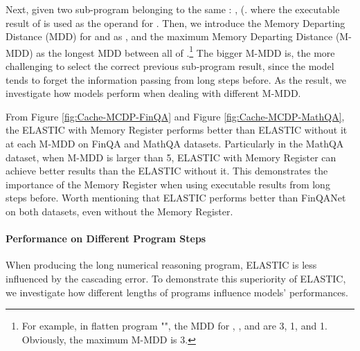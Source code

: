 \documentclass{article}
\begin{document}
Next, given two sub-program belonging to the same : ,  (. where the executable result of  is used as the operand for . Then, we introduce the Memory Departing Distance (MDD) for  and  as , and the maximum Memory Departing Distance (M-MDD) as the longest MDD between all  of .\footnote{For example, in flatten program "", the MDD for , , and  are 3, 1, and 1. Obviously, the maximum M-MDD is 3.} The bigger M-MDD is, the more challenging to select the correct previous sub-program result, since the model tends to forget the information passing from long steps before. As the result, we investigate how models perform when dealing with different M-MDD.

From Figure \ref{fig:Cache-MCDP-FinQA} and Figure \ref{fig:Cache-MCDP-MathQA}, the ELASTIC with Memory Register performs better than ELASTIC without it at each M-MDD on FinQA and MathQA datasets. Particularly in the MathQA dataset, when M-MDD is larger than 5, ELASTIC with Memory Register can achieve better results than the ELASTIC without it. This demonstrates the importance of the Memory Register when using executable results from long steps before. Worth mentioning that ELASTIC performs better than FinQANet on both datasets, even without the Memory Register.



\paragraph{Performance on Different Program Steps}

When producing the long numerical reasoning program, ELASTIC is less influenced by the cascading error. To demonstrate this superiority of ELASTIC, we investigate how different lengths of programs influence models' performances.
\end{document}
